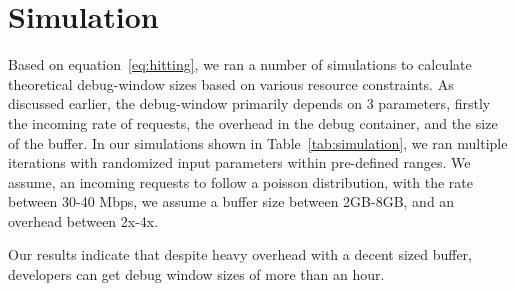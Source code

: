 \section{Simulation}
\label{sec:simulation}

Based on equation~\ref{eq:hitting}, we ran a number of simulations to calculate theoretical debug-window sizes based on various resource constraints. 
As discussed earlier, the debug-window primarily depends on 3 parameters, firstly the incoming rate of requests, the overhead in the debug container, and the size of the buffer.
In our simulations shown in Table~\ref{tab:simulation}, we ran multiple iterations with randomized input parameters within pre-defined ranges. 
We assume, an incoming requests to follow a poisson distribution,  with the rate between 30-40 Mbps, we assume a buffer size between 2GB-8GB, and an overhead between 2x-4x. 

Our results indicate that despite heavy overhead with a decent sized buffer, developers can get debug window sizes of more than an hour. 
 
